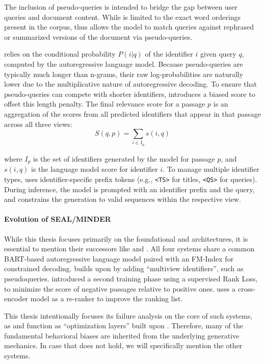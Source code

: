 The inclusion of pseudo-queries is intended to bridge the gap between user queries and document content. While  is limited to the exact word orderings present in the corpus,  thus allows the model to match queries against rephrased or summarized versions of the document via pseudo-queries.

 relies on the conditional probability $P(i\allowbreak|q)$ of the identifier $i$ given query $q$, computed by the autoregressive language model. Because pseudo-queries are typically much longer than n-grams, their raw log-probabilities are naturally lower due to the multiplicative nature of autoregressive decoding. To ensure that pseudo-queries can compete with shorter identifiers,  introduces a biased score to offset this length penalty. The final relevance score for a passage $p$ is an aggregation of the scores from all predicted identifiers that appear in that passage across all three views:
\begin{equation}
   S(q, p) = \sum_{i \in I_p} s(i, q)
   \label{eq:minder-aggregation}
\end{equation}

where $I_p$ is the set of identifiers generated by the model for passage $p$, and $s(i, q)$ is the language model score for identifier $i$. To manage multiple identifier types,  uses identifier-specific prefix tokens (e.g., \texttt{<TS>} for titles, \texttt{<QS>} for queries). During inference, the model is prompted with an identifier prefix and the query, and constrains the generation to valid sequences within the respective view.

\paragraph{Evolution of SEAL/MINDER}

While this thesis focuses primarily on the foundational  and  architectures, it is essential to mention their successors like  and . All four systems share a common BART-based autoregressive language model paired with an FM-Index for constrained decoding.  builds upon  by adding ``multiview identifiers'', such as pseudoqueries.  introduced a second training phase using a supervised Rank Loss, to minimize the score of negative passages relative to positive ones.  uses a cross-encoder model as a re-ranker to improve the ranking list.

This thesis intentionally focuses its failure analysis on the core of such systems, as  and  function as ``optimization layers'' built upon . Therefore, many of the fundamental behavioral biases are inherited from the underlying generative mechanics. In case that does not hold, we will specifically mention the other systems. 


